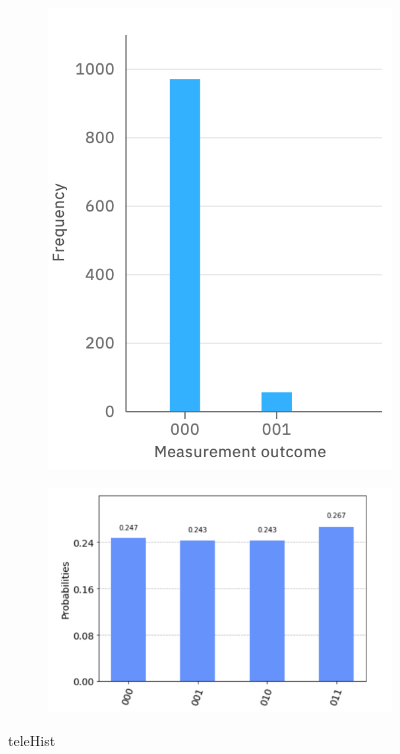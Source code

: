 \begin{figure}[h]
    \centering
    \begin{subfigure}[h]{0.33\textwidth}
        \centering
        \includegraphics[width=\textwidth]{lab3/images/ibmTeleport.png}
        \caption{}
        \label{fig:ibmHistogram}
    \end{subfigure}
    \hspace{0.2\textwidth}
    \begin{subfigure}[h]{0.33\textwidth}
        \centering
        \includegraphics[width=\textwidth]{lab3/images/qiskitHist.png}
        \caption{}
        \label{fig:qiskitHistogram}
    \end{subfigure}
    \caption{teleHist} 
    \label{fig:teleHist}
\end{figure}

